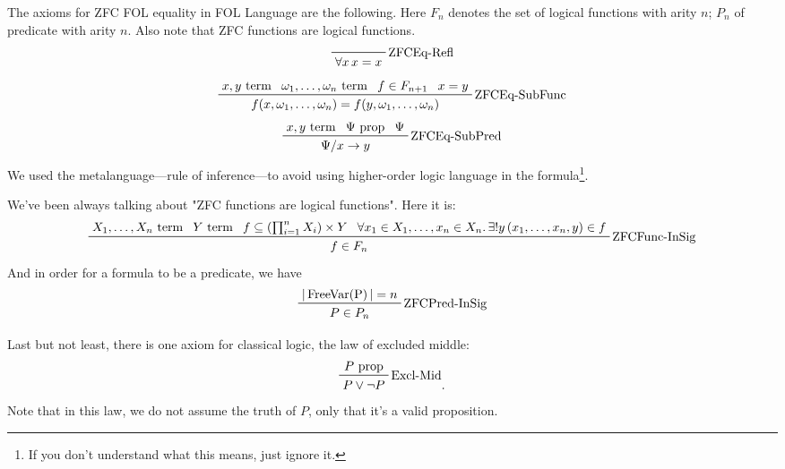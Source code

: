 \documentclass[../main.tex]{subfiles}
\begin{document}
The axioms for ZFC FOL equality in FOL Language are the following. Here $F_n$ denotes the set of logical functions with arity $n$; $P_n$ of predicate with arity $n$. Also note that ZFC functions are logical functions.
$$\prfbyaxiom{ZFCEq-Refl}{\forall x\, x=x}$$
$$\prftree[r]{ZFCEq-SubFunc}{x,y\text{ term}}{\omega_1,\dots,\omega_n\text{ term}}{f\in F_{n+1}}{x=y}{f(x,\omega_1,\dots,\omega_n)=f(y,\omega_1,\dots,\omega_n)}$$
$$\prftree[r]{ZFCEq-SubPred}{x,y\text{ term}}{\Psi\text{ prop}}{\Psi}{\Psi/x\to y}$$
We used the metalanguage---rule of inference---to avoid using higher-order logic language in the formula\footnote{If you don't understand what this means, just ignore it.}.

We've been always talking about "ZFC functions are logical functions". Here it is:
$$\prftree[r]{ZFCFunc-InSig}{X_1,\dots,X_n\text{ term}}{Y\text{ term}}{f\subseteq\left(\textstyle\prod_{i=1}^nX_i\right)\times Y}{\forall x_1\in X_1,\dots,x_n\in X_n.\,\exists!y\,(x_1,\dots,x_n,y)\in f}{f\in F_{n}}$$
And in order for a formula to be a predicate, we have
$$
\prftree[r]{ZFCPred-InSig}{|\operatorname{FreeVar(P)}|=n}{P\in P_n}
$$

Last but not least, there is one axiom for classical logic, the law of excluded middle:
$$\prftree[r]{Excl-Mid}{P\text{ prop}}{P\lor\neg P}.$$ Note that in this law, we do not assume the truth of $P$, only that it's a valid proposition.
\end{document}
